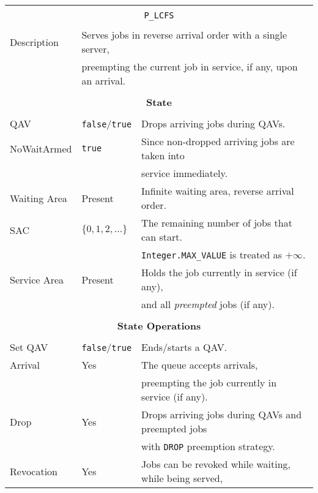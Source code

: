 \documentclass[12pt]{book}
\begin{document}
\begin{tabular}{|l|l|l|}
\hline
\multicolumn{3}{|c|}{} \\
\multicolumn{3}{|c|}{\lstinline[basicstyle=\large]{P_LCFS}} \\
\multicolumn{3}{|c|}{} \\
\hline
Description & \multicolumn{2}{|l|}{Serves jobs in reverse arrival order with a single server,} \\
            & \multicolumn{2}{|l|}{preempting the current job in service, if any, upon an arrival.} \\
\hline
\multicolumn{3}{|c|}{} \\
\multicolumn{3}{|c|}{\bf State} \\
\multicolumn{3}{|c|}{} \\
\hline
QAV & \lstinline|false|/\lstinline|true| & Drops arriving jobs during QAVs. \\
\hline
NoWaitArmed & \lstinline|true| & Since non-dropped arriving jobs are taken into \\
            &                  & service immediately. \\
\hline
Waiting Area & Present & Infinite waiting area, reverse arrival order. \\
\hline
SAC & $\{0, 1, 2, \ldots\}$ & The remaining number of jobs that can start. \\
    &                       & \lstinline|Integer.MAX_VALUE| is treated as $+\infty$. \\
\hline
Service Area & Present & Holds the job currently in service (if any), \\
             &         & and all {\em preempted\/} jobs (if any). \\
\hline
\multicolumn{3}{|c|}{} \\
\multicolumn{3}{|c|}{\bf State Operations} \\
\multicolumn{3}{|c|}{} \\
\hline
Set QAV & \lstinline|false|/\lstinline|true| & Ends/starts a QAV. \\
\hline
Arrival & Yes & The queue accepts arrivals, \\
        &     & preempting the job currently in service (if any). \\
\hline
Drop & Yes & Drops arriving jobs during QAVs and preempted jobs \\
     &     & with \lstinline|DROP| preemption strategy. \\
\hline
Revocation & Yes & Jobs can be revoked while waiting, while being served, \\

\end{tabular}
\end{document}
